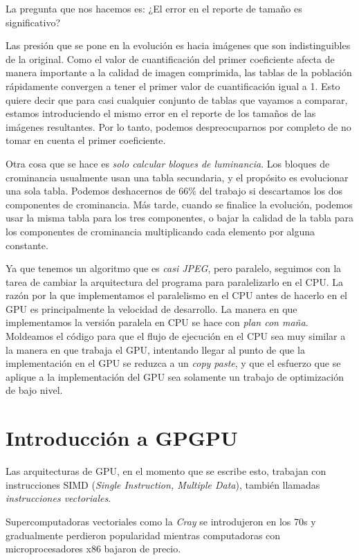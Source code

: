 La pregunta que nos hacemos es: ¿El error en el reporte de tamaño es
significativo?

Las presión que se pone en la evolución es hacia imágenes que son
indistinguibles de la original. Como el valor de cuantificación del primer
coeficiente afecta de manera importante a la calidad de imagen comprimida, las
tablas de la población rápidamente convergen a tener el primer valor de
cuantificación igual a 1. Esto quiere decir que para casi cualquier conjunto de
tablas que vayamos a comparar, estamos introduciendo el mismo error en el
reporte de los tamaños de las imágenes resultantes. Por lo tanto, podemos
despreocuparnos por completo de no tomar en cuenta el primer coeficiente.

Otra cosa que se hace es \emph{solo calcular bloques de luminancia}. Los
bloques de crominancia usualmente usan una tabla secundaria, y el propósito es
evolucionar una sola tabla. Podemos deshacernos de $66\%$ del trabajo si
descartamos los dos componentes de crominancia. Más tarde, cuando se finalice
la evolución, podemos usar la misma tabla para los tres componentes, o bajar la
calidad de la tabla para los componentes de crominancia multiplicando cada
elemento por alguna constante.

Ya que tenemos un algoritmo que es \emph{casi JPEG}, pero paralelo, seguimos
con la tarea de cambiar la arquitectura del programa para paralelizarlo en el
CPU. La razón por la que implementamos el paralelismo en el CPU antes de
hacerlo en el GPU es principalmente la velocidad de desarrollo. La manera en
que implementamos la versión paralela en CPU se hace con \emph{plan con maña}.
Moldeamos el código para que el flujo de ejecución en el CPU sea muy
similar a la manera en que trabaja el GPU, intentando llegar al punto de que la
implementación en el GPU se reduzca a un \emph{copy paste}, y que el esfuerzo
que se aplique a la implementación del GPU sea solamente un trabajo de
optimización de bajo nivel.

\section{Introducción a GPGPU}

Las arquitecturas de GPU, en el momento que se escribe esto, trabajan con
instrucciones SIMD (\emph{Single Instruction, Multiple Data}), también llamadas
\emph{instrucciones vectoriales}.

Supercomputadoras vectoriales como la \emph{Cray} se introdujeron en los 70s y
gradualmente perdieron popularidad mientras computadoras con microprocesadores
x86 bajaron de precio.

